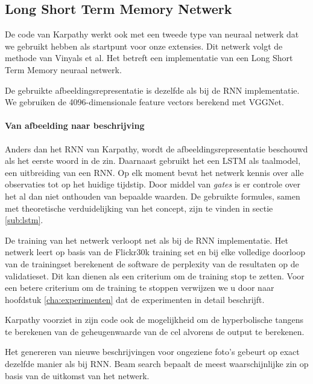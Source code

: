 \subsection{Long Short Term Memory Netwerk}
\label{sec:lstm}
De code van Karpathy werkt ook met een tweede type van neuraal netwerk dat we gebruikt hebben als startpunt voor onze extensies. Dit netwerk volgt de methode van Vinyals et al.\cite{Google} Het betreft een implementatie van een Long Short Term Memory neuraal netwerk. 

De gebruikte afbeeldingsrepresentatie is dezelfde als bij de RNN implementatie. We gebruiken de 4096-dimensionale feature vectors berekend met VGGNet. 

\paragraph{Van afbeelding naar beschrijving}
Anders dan het RNN van Karpathy, wordt de afbeeldingsrepresentatie beschouwd als het eerste woord in de zin. Daarnaast gebruikt het een LSTM als taalmodel, een uitbreiding van een RNN. Op elk moment bevat het netwerk kennis over alle observaties tot op het huidige tijdstip. Door middel van \emph{gates} is er controle over het al dan niet onthouden van bepaalde waarden. De gebruikte formules, samen met theoretische verduidelijking van het concept, zijn te vinden in sectie \ref{sub:lstm}.

De training van het netwerk verloopt net als bij de RNN implementatie. Het netwerk leert op basis van de Flickr30k training set en bij elke volledige doorloop van de trainingset berekenent de software de perplexity van de resultaten op de validatieset. Dit kan dienen als een criterium om de training stop te zetten. Voor een betere criterium om de training te stoppen verwijzen we u door naar hoofdstuk \ref{cha:experimenten} dat de experimenten in detail beschrijft. %

Karpathy voorziet in zijn code ook de mogelijkheid om de hyperbolische tangens te berekenen van de geheugenwaarde van de cel alvorens de output te berekenen.  

Het genereren van nieuwe beschrijvingen voor ongeziene foto's gebeurt op exact dezelfde manier als bij RNN. Beam search bepaalt de meest waarschijnlijke zin op basis van de uitkomst van het netwerk.




